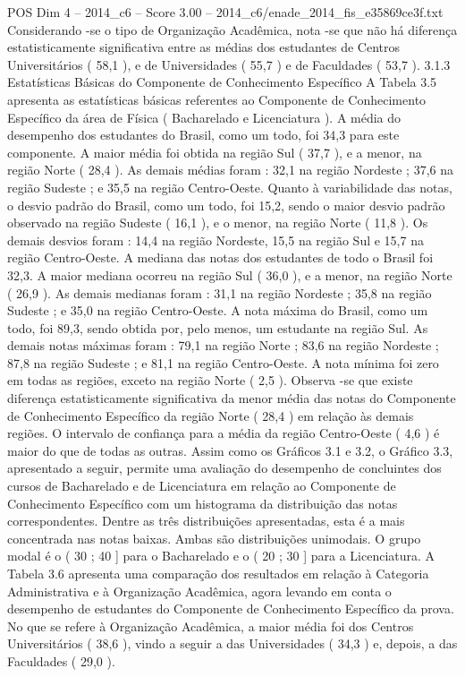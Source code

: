 \begin{textsample}{POS Dim 4 – 2014\_c6 – Score 3.00 – 2014\_c6/enade\_2014\_fis\_e35869ce3f.txt}
Considerando -se o tipo de Organização Acadêmica, nota -se que não há diferença estatisticamente significativa entre as médias dos estudantes de Centros Universitários ( 58,1 ), e de Universidades ( 55,7 ) e de Faculdades ( 53,7 ). 3.1.3 Estatísticas Básicas do Componente de Conhecimento Específico A Tabela 3.5 apresenta as estatísticas básicas referentes ao Componente de Conhecimento Específico da área de Física ( Bacharelado e Licenciatura ).
A média do desempenho dos estudantes do Brasil, como um todo, foi 34,3 para este componente.
A maior média foi obtida na região Sul ( 37,7 ), e a menor, na região Norte ( 28,4 ).
As demais médias foram : 32,1 na região Nordeste ; 37,6 na região Sudeste ; e 35,5 na região Centro-Oeste.
Quanto à variabilidade das notas, o desvio padrão do Brasil, como um todo, foi 15,2, sendo o maior desvio padrão observado na região Sudeste ( 16,1 ), e o menor, na região Norte ( 11,8 ).
Os demais desvios foram : 14,4 na região Nordeste, 15,5 na região Sul e 15,7 na região Centro-Oeste.
A mediana das notas dos estudantes de todo o Brasil foi 32,3.
A maior mediana ocorreu na região Sul ( 36,0 ), e a menor, na região Norte ( 26,9 ).
As demais medianas foram : 31,1 na região Nordeste ; 35,8 na região Sudeste ; e 35,0 na região Centro-Oeste.
A nota máxima do Brasil, como um todo, foi 89,3, sendo obtida por, pelo menos, um estudante na região Sul.
As demais notas máximas foram : 79,1 na região Norte ; 83,6 na região Nordeste ; 87,8 na região Sudeste ; e 81,1 na região Centro-Oeste.
A nota mínima foi zero em todas as regiões, exceto na região Norte ( 2,5 ).
Observa -se que existe diferença estatisticamente significativa da menor média das notas do Componente de Conhecimento Específico da região Norte ( 28,4 ) em relação às demais regiões.
O intervalo de confiança para a média da região Centro-Oeste ( 4,6 ) é maior do que de todas as outras.
Assim como os Gráficos 3.1 e 3.2, o Gráfico 3.3, apresentado a seguir, permite uma avaliação do desempenho de concluintes dos cursos de Bacharelado e de Licenciatura em relação ao Componente de Conhecimento Específico com um histograma da distribuição das notas correspondentes.
Dentre as três distribuições apresentadas, esta é a mais concentrada nas notas baixas.
Ambas são distribuições unimodais.
O grupo modal é o ( 30 ; 40 ] para o Bacharelado e o ( 20 ; 30 ] para a Licenciatura.
A Tabela 3.6 apresenta uma comparação dos resultados em relação à Categoria Administrativa e à Organização Acadêmica, agora levando em conta o desempenho de estudantes do Componente de Conhecimento Específico da prova.
No que se refere à Organização Acadêmica, a maior média foi dos Centros Universitários ( 38,6 ), vindo a seguir a das Universidades ( 34,3 ) e, depois, a das Faculdades ( 29,0 ).

\end{textsample}

